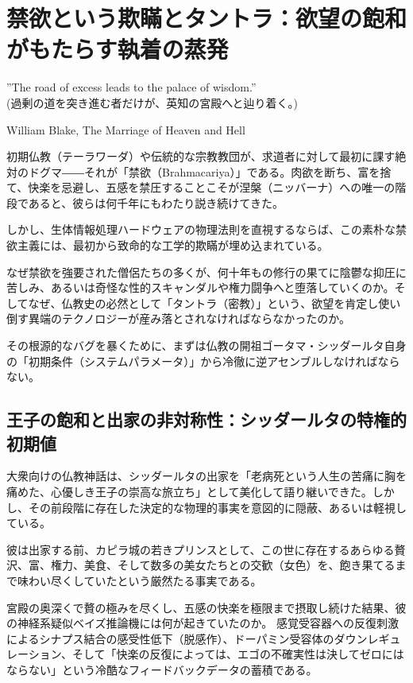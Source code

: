 \chapter{禁欲という欺瞞とタントラ：欲望の飽和がもたらす執着の蒸発}

\epigraph{”The road of excess leads to the palace of wisdom.”\\
(過剰の道を突き進む者だけが、英知の宮殿へと辿り着く。)}{William Blake, The Marriage of Heaven and Hell}

初期仏教（テーラワーダ）や伝統的な宗教教団が、求道者に対して最初に課す絶対のドグマ――それが「禁欲（Brahmacariya）」である。肉欲を断ち、富を捨て、快楽を忌避し、五感を禁圧することこそが涅槃（ニッバーナ）への唯一の階段であると、彼らは何千年にもわたり説き続けてきた。

しかし、生体情報処理ハードウェアの物理法則を直視するならば、この素朴な禁欲主義には、最初から致命的な工学的欺瞞が埋め込まれている。

なぜ禁欲を強要された僧侶たちの多くが、何十年もの修行の果てに陰鬱な抑圧に苦しみ、あるいは奇怪な性的スキャンダルや権力闘争へと堕落していくのか。そしてなぜ、仏教史の必然として「タントラ（密教）」という、欲望を肯定し使い倒す異端のテクノロジーが産み落とされなければならなかったのか。

その根源的なバグを暴くために、まずは仏教の開祖ゴータマ・シッダールタ自身の「初期条件（システムパラメータ）」から冷徹に逆アセンブルしなければならない。

\section{王子の飽和と出家の非対称性：シッダールタの特権的初期値}

大衆向けの仏教神話は、シッダールタの出家を「老病死という人生の苦痛に胸を痛めた、心優しき王子の崇高な旅立ち」として美化して語り継いできた。しかし、その前段階に存在した決定的な物理的事実を意図的に隠蔽、あるいは軽視している。

彼は出家する前、カピラ城の若きプリンスとして、この世に存在するあらゆる贅沢、富、権力、美食、そして数多の美女たちとの交歓（女色）を、飽き果てるまで味わい尽くしていたという厳然たる事実である。

宮殿の奥深くで贅の極みを尽くし、五感の快楽を極限まで摂取し続けた結果、彼の神経系疑似ベイズ推論機には何が起きていたのか。
感覚受容器への反復刺激によるシナプス結合の感受性低下（脱感作）、ドーパミン受容体のダウンレギュレーション、そして「快楽の反復によっては、エゴの不確実性は決してゼロにはならない」という冷酷なフィードバックデータの蓄積である。

